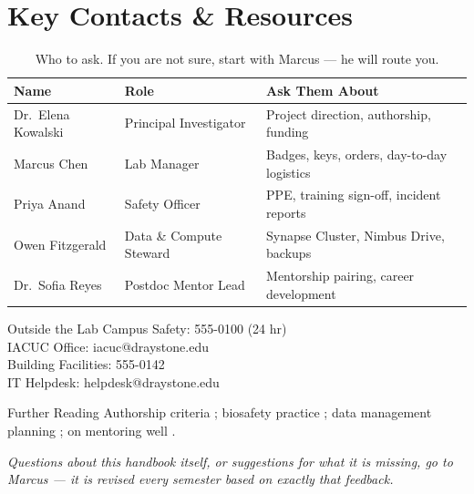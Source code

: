 \section{Key Contacts \& Resources}
\label{sec:contacts}

\begin{table}[h]
\centering
\small
\begin{tabular}{@{}p{3.6cm}p{3.6cm}p{6.0cm}@{}}
\toprule
\rowcolor{labpale}
\textbf{Name} & \textbf{Role} & \textbf{Ask Them About} \\
\midrule
Dr.\ Elena Kowalski & Principal Investigator & Project direction, authorship, funding \\
Marcus Chen & Lab Manager & Badges, keys, orders, day-to-day logistics \\
Priya Anand & Safety Officer & PPE, training sign-off, incident reports \\
Owen Fitzgerald & Data \& Compute Steward & Synapse Cluster, Nimbus Drive, backups \\
Dr.\ Sofia Reyes & Postdoc Mentor Lead & Mentorship pairing, career development \\
\bottomrule
\end{tabular}
\caption{Who to ask. If you are not sure, start with Marcus --- he will route you.}
\end{table}

\begin{minipage}[t]{0.485\textwidth}
\begin{factbox}{Outside the Lab}
Campus Safety: 555-0100 (24 hr)\\
IACUC Office: iacuc@draystone.edu\\
Building Facilities: 555-0142\\
IT Helpdesk: helpdesk@draystone.edu
\end{factbox}
\end{minipage}\hfill%
\begin{minipage}[t]{0.485\textwidth}
\begin{factbox}{Further Reading}
Authorship criteria \cite{icmje2024}; biosafety practice \cite{nrc2020biosafety};
data management planning \cite{nih2023dmsp}; on mentoring well \cite{nap1997adviser}.
\end{factbox}
\end{minipage}
\par

\vspace{0.4em}
{\small\itshape Questions about this handbook itself, or suggestions for what it is missing,
go to Marcus --- it is revised every semester based on exactly that feedback.}
